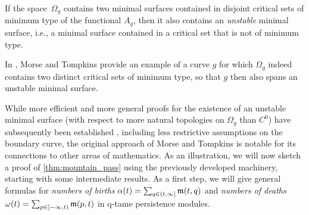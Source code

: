 \begin{thm}
\label{thm:unstable_minimial_surface}
	If the space~$\Omega_g$ contains two minimal surfaces contained in disjoint critical sets of minimum type of the functional $A_g$, then it also contains an \emph{unstable} minimal surface, i.e., a minimal surface contained in a critical set that is not of minimum type.
\end{thm}

In \cite[Section 8]{Morse.1939}, Morse and Tompkins provide an example of a curve $g$ for which $\Omega_{g}$ indeed contains two distinct critical sets of minimum type, so that $g$ then also spans an unstable minimal surface.

While more efficient and more general proofs for the existence of an unstable minimal surface (with respect to more natural topologies on $\Omega_{g}$ than $C^0$) have subsequently been established \cite{Struwe.1988,Dierkes.2010}, including less restrictive assumptions on the boundary curve, the original approach of Morse and Tompkins is notable
for its connections to other areas of mathematics.
As an illustration, we will now sketch a proof of \cref{thm:mountain_pass} using the previously developed machinery, starting with some intermediate results.
As a first step, we will give general formulas for \emph{numbers of births} $\alpha(t) = \sum_{q \in (t, \infty]} \mathfrak{m}(t,q)$ and \emph{numbers of deaths} $\omega(t) = \sum_{p \in [-\infty, t)} \mathfrak{m}(p,t)$ in q-tame persistence modules.

